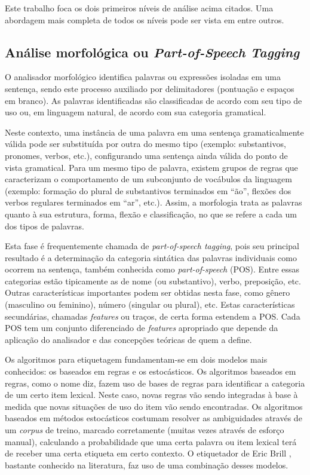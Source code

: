 Este trabalho foca os dois primeiros níveis de análise acima citados. Uma abordagem mais completa de todos os níveis pode ser vista em \cite{allen95,vera01} entre outros.


\subsection{Análise morfológica ou \emph{Part-of-Speech Tagging}} %
\label{sub:analise_morfologica_ou_part_of_speech_tagging}

O analisador morfológico identifica palavras ou expressões isoladas em uma sentença, sendo este processo auxiliado por delimitadores (pontuação e espaços em branco). As palavras identificadas são classificadas de acordo com seu tipo de uso ou, em linguagem natural, de acordo com sua categoria gramatical.

Neste contexto, uma instância de uma palavra em uma sentença gramaticalmente válida pode ser substituída por outra do mesmo tipo (exemplo: substantivos, pronomes, verbos, etc.), configurando uma sentença ainda válida do ponto de vista gramatical. Para um mesmo tipo de palavra, existem grupos de regras que caracterizam o comportamento de um subconjunto de vocábulos da linguagem (exemplo: formação do plural de substantivos terminados em ``ão'', flexões dos verbos regulares terminados em ``ar'', etc.). Assim, a morfologia trata as palavras quanto à sua estrutura, forma, flexão e classificação, no que se refere a cada um dos tipos de palavras.

Esta fase é frequentemente chamada de \emph{part-of-speech tagging}, pois seu principal resultado é a determinação da categoria sintática das palavras individuais como ocorrem na sentença, também conhecida como \emph{part-of-speech} (POS). Entre essas categorias estão tipicamente as de nome (ou substantivo), verbo, preposição, etc. Outras características importantes podem ser obtidas nesta fase, como gênero (masculino ou feminino), número (singular ou plural), etc. Estas características secundárias, chamadas \emph{features} ou traços, de certa forma estendem a POS. Cada POS tem um conjunto diferenciado de \emph{features} apropriado que depende da aplicação do analisador e das concepções teóricas de quem a define. 

Os algoritmos para etiquetagem fundamentam-se em dois modelos mais conhecidos: os baseados em regras e os estocásticos. Os algoritmos baseados em regras, como o nome diz, fazem uso de bases de regras para identificar a categoria de um certo item lexical. Neste caso, novas regras vão sendo integradas à base à medida que novas situações de uso do item vão sendo encontradas. Os algoritmos baseados em métodos estocásticos costumam resolver as ambiguidades através de um \emph{corpus} de treino, marcado corretamente (muitas vezes através de esforço manual), calculando a probabilidade que uma certa palavra ou item lexical terá de receber uma certa etiqueta em certo contexto. O etiquetador de Eric Brill \cite{brill95}, bastante conhecido na literatura, faz uso de uma combinação desses modelos.

